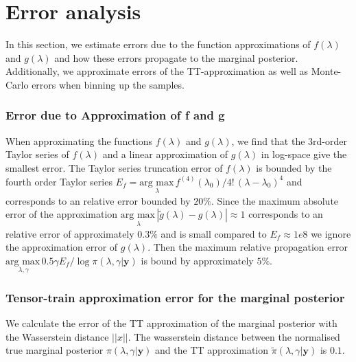 \section{Error analysis}
In this section, we estimate errors due to the function approximations of $f(\lambda)$ and $g(\lambda)$ and how these errors propagate to the marginal posterior.
Additionally, we approximate errors of the TT-approximation as well as Monte-Carlo errors when binning up the samples.

\subsubsection{Error due to Approximation of f and g}
\label{sec:fgErros}
When approximating the functions $f(\lambda)$ and $g(\lambda)$, we find that the 3rd-order Taylor series of $f(\lambda)$ and a linear approximation of $g(\lambda)$ in log-space give the smallest error.
The Taylor series truncation error of $f(\lambda)$ is bounded by the fourth order Taylor series $E_f = \underset{\lambda}{\text{arg max}\,} f^{(4)}(\lambda_0)/ 4! \, (\lambda - \lambda_{0} )^4$ and corresponds to an relative error bounded by $20\%$.
Since the maximum absolute error of the approximation $\underset{\lambda}{\text{arg max}\,}|\tilde{g}(\lambda) - g(\lambda) | \approx 1$ corresponds to an relative error of approximately $0.3\%$ and is small compared to $E_f \approx 1e8$ we ignore the approximation error of $g(\lambda)$.
Then the maximum relative propagation error $\underset{\lambda, \gamma}{\text{arg max}\,} 0.5 \gamma  E_f / \log{\pi{(\lambda ,\gamma | \bm{y})}} $ is bound by approximately $5\%$.
\subsubsection{Tensor-train approximation error for the marginal posterior}
We calculate the error of the TT approximation of the marginal posterior with the Wasserstein distance $||x||$.
The wasserstein distance between the normalised true marginal posterior $\pi(\lambda,\gamma|\bm{y})$ and the TT approximation $\tilde{\pi}(\lambda,\gamma|\bm{y})$ is $0.1$.

